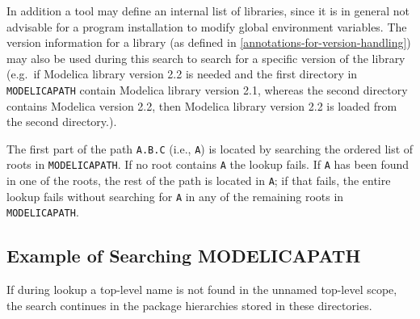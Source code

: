 In addition a tool may define an internal list of libraries, since it is
in general not advisable for a program installation to modify global
environment variables. The version information for a library (as defined
in \cref{annotations-for-version-handling}) may also be used during this search to search for a
specific version of the library (e.g.\ if Modelica library version 2.2 is
needed and the first directory in \lstinline!MODELICAPATH! contain Modelica library
version 2.1, whereas the second directory contains Modelica version 2.2,
then Modelica library version 2.2 is loaded from the second directory.).

\begin{nonnormative}
The first part of the path \lstinline!A.B.C! (i.e., \lstinline!A!) is located by searching the ordered list of roots in \lstinline!MODELICAPATH!.  If no root contains
\lstinline!A! the lookup fails.  If \lstinline!A! has been found in one of the roots, the rest of the path is located in \lstinline!A!; if that fails, the entire lookup
fails without searching for \lstinline!A! in any of the remaining roots in \lstinline!MODELICAPATH!.
\end{nonnormative}

\subsection{Example of Searching MODELICAPATH}\label{example-of-searching-modelicapath}

If during lookup a top-level name is not found in the unnamed top-level
scope, the search continues in the package hierarchies stored in these
directories.

